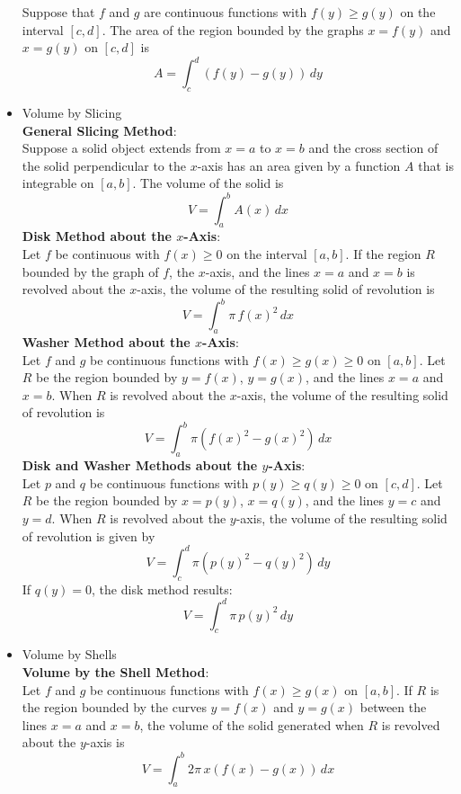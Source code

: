 \documentclass{article}
\begin{document}
\begin{itemize}
        Suppose that $f$ and $g$ are continuous functions with $f(y) \geq g(y)$ on the interval $[c,d]$. The area of the region bounded by the graphs $x = f(y)$ and $x = g(y)$ on $[c,d]$ is
        $$A = \int_c^d{\left(f(y) - g(y)\right)\,dy}$$
    \item Volume by Slicing \\
        \textbf{General Slicing Method}: \\
        Suppose a solid object extends from $x = a$ to $x = b$ and the cross section of the solid perpendicular to the $x$-axis has an area given by a function $A$ that is integrable on $[a,b]$. The volume of the solid is
        $$V = \int_a^b{A(x)\,dx}$$
        \textbf{Disk Method about the $x$-Axis}: \\
        Let $f$ be continuous with $f(x) \geq 0$ on the interval $[a,b]$. If the region $R$ bounded by the graph of $f$, the $x$-axis, and the lines $x = a$ and $x = b$ is revolved about the $x$-axis, the volume of the resulting solid of revolution is
        $$V = \int_a^b{\pi\,f(x)^2\,dx}$$
        \textbf{Washer Method about the $x$-Axis}: \\
        Let $f$ and $g$ be continuous functions with $f(x) \geq g(x) \geq 0$ on $[a,b]$. Let $R$ be the region bounded by $y = f(x)$, $y = g(x)$, and the lines $x = a$ and $x = b$. When $R$ is revolved about the $x$-axis, the volume of the resulting solid of revolution is
        $$V = \int_a^b{\pi\left(f(x)^2 - g(x)^2\right)\,dx}$$
        \textbf{Disk and Washer Methods about the $y$-Axis}: \\
        Let $p$ and $q$ be continuous functions with $p(y) \geq q(y) \geq 0$ on $[c,d]$. Let $R$ be the region bounded by $x = p(y)$, $x = q(y)$, and the lines $y = c$ and $y = d$. When $R$ is revolved about the $y$-axis, the volume of the resulting solid of revolution is given by
        $$V = \int_c^d{\pi\left(p(y)^2 - q(y)^2\right)\,dy}$$
        If $q(y) = 0$, the disk method results:
        $$V = \int_c^d{\pi\,p(y)^2\,dy}$$
    \item Volume by Shells \\
        \textbf{Volume by the Shell Method}: \\
        Let $f$ and $g$ be continuous functions with $f(x) \geq g(x)$ on $[a,b]$. If $R$ is the region bounded by the curves $y = f(x)$ and $y = g(x)$ between the lines $x = a$ and $x = b$, the volume of the solid generated when $R$ is revolved about the $y$-axis is
        $$V = \int_a^b{2\pi\,x\left(f(x) - g(x)\right)\,dx}$$
\end{itemize}
\end{document}
